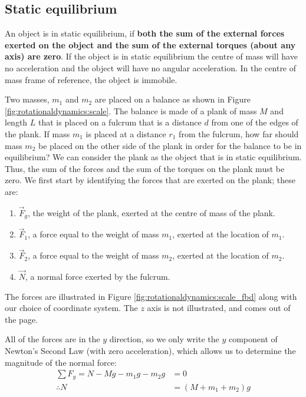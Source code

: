 \subsection{Static equilibrium}
An object is in static equilibrium, if \textbf{both the sum of the external forces exerted on the object and the sum of the external torques (about any axis) are zero}. If the object is in static equilibrium the centre of mass will have no acceleration and the object will have no angular acceleration. In the centre of mass frame of reference, the object is immobile. 
\begin{example}{
 Two masses, $m_1$ and $m_2$ are placed on a balance as shown in Figure \ref{fig:rotationaldynamics:scale}. The balance is made of a plank of mass $M$ and length $L$ that is placed on a fulcrum that is a distance $d$ from one of the edges of the plank. If mass $m_1$ is placed at a distance $r_1$ from the fulcrum, how far should mass $m_2$ be placed on the other side of the plank in order for the balance to be in equilibrium?}
We can consider the plank as the object that is in static equilibrium. Thus, the sum of the forces and the sum of the torques on the plank must be zero. We first start by identifying the forces that are exerted on the plank; these are:
\begin{enumerate}
\item $\vec F_g$, the weight of the plank, exerted at the centre of mass of the plank.
\item $\vec F_1$, a force equal to the weight of mass $m_1$, exerted at the location of $m_1$. 
\item $\vec F_2$, a force equal to the weight of mass $m_2$, exerted at the location of $m_2$.
\item $\vec N$, a normal force exerted by the fulcrum.
\end{enumerate} 
The forces are illustrated in Figure \ref{fig:rotationaldynamics:scale_fbd} along with our choice of coordinate system. The $z$ axis is not illustrated, and comes out of the page. 

All of the forces are in the $y$ direction, so we only write the $y$ component of Newton's Second Law (with zero acceleration), which allows us to determine the magnitude of the normal force:
\begin{align*}
\sum F_y = N - Mg -m_1g - m_2 g &=0\\
\therefore N &= (M+m_1+m_2) g
\end{align*}


\end{example}
